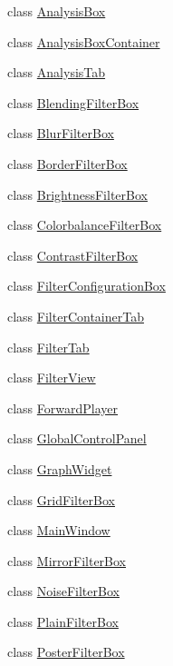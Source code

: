 \begin{DoxyCompactItemize}
\item 
class \hyperlink{classGUI_1_1AnalysisBox}{Analysis\+Box}
\item 
class \hyperlink{classGUI_1_1AnalysisBoxContainer}{Analysis\+Box\+Container}
\item 
class \hyperlink{classGUI_1_1AnalysisTab}{Analysis\+Tab}
\item 
class \hyperlink{classGUI_1_1BlendingFilterBox}{Blending\+Filter\+Box}
\item 
class \hyperlink{classGUI_1_1BlurFilterBox}{Blur\+Filter\+Box}
\item 
class \hyperlink{classGUI_1_1BorderFilterBox}{Border\+Filter\+Box}
\item 
class \hyperlink{classGUI_1_1BrightnessFilterBox}{Brightness\+Filter\+Box}
\item 
class \hyperlink{classGUI_1_1ColorbalanceFilterBox}{Colorbalance\+Filter\+Box}
\item 
class \hyperlink{classGUI_1_1ContrastFilterBox}{Contrast\+Filter\+Box}
\item 
class \hyperlink{classGUI_1_1FilterConfigurationBox}{Filter\+Configuration\+Box}
\item 
class \hyperlink{classGUI_1_1FilterContainerTab}{Filter\+Container\+Tab}
\item 
class \hyperlink{classGUI_1_1FilterTab}{Filter\+Tab}
\item 
class \hyperlink{classGUI_1_1FilterView}{Filter\+View}
\item 
class \hyperlink{classGUI_1_1ForwardPlayer}{Forward\+Player}
\item 
class \hyperlink{classGUI_1_1GlobalControlPanel}{Global\+Control\+Panel}
\item 
class \hyperlink{classGUI_1_1GraphWidget}{Graph\+Widget}
\item 
class \hyperlink{classGUI_1_1GridFilterBox}{Grid\+Filter\+Box}
\item 
class \hyperlink{classGUI_1_1MainWindow}{Main\+Window}
\item 
class \hyperlink{classGUI_1_1MirrorFilterBox}{Mirror\+Filter\+Box}
\item 
class \hyperlink{classGUI_1_1NoiseFilterBox}{Noise\+Filter\+Box}
\item 
class \hyperlink{classGUI_1_1PlainFilterBox}{Plain\+Filter\+Box}
\item 
class \hyperlink{classGUI_1_1PosterFilterBox}{Poster\+Filter\+Box}
\item 

\end{DoxyCompactItemize}
